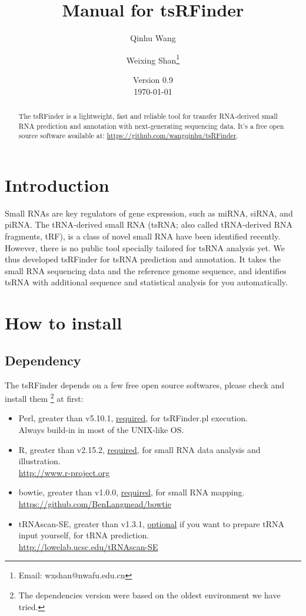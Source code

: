 \documentclass[11pt, a4paper]{article}
\title{Manual for tsRFinder}
\author{Qinhu Wang}
\author{Weixing Shan\thanks{Email: wxshan@nwafu.edu.cn}}
\affil{Northwest A\&F University}
\date{Version 0.9\\[3pt] \today}
\begin{document}
\maketitle

\begin{abstract}
The tsRFinder is a lightweight, fast and reliable tool for transfer RNA-derived small RNA prediction and annotation with next-generating sequencing data. It's a free open source software available at: \url{https://github.com/wangqinhu/tsRFinder}.
\end{abstract}

\clearpage

\tableofcontents

\clearpage

\section{Introduction}

Small RNAs are key regulators of gene expression, such as miRNA, siRNA, and piRNA. The tRNA-derived small RNA (tsRNA; also called tRNA-derived RNA fragments, tRF), is a class of novel small RNA have been identified recently. However, there is no public tool specially tailored for tsRNA analysis yet. We thus developed tsRFinder for tsRNA prediction and annotation. It takes the small RNA sequencing data and the reference genome sequence, and identifies tsRNA with additional sequence and statistical analysis for you automatically.

\section{How to install}

\subsection{Dependency}

The tsRFinder depends on a few free open source softwares, please check and install them \footnote{The dependencies version were based on the oldest environment we have tried.} at first:

\begin{itemize}

\item Perl, greater than v5.10.1, \underline{required}, for tsRFinder.pl execution.\\ Always build-in in most of the UNIX-like OS.
\item R, greater than v2.15.2, \underline{required}, for small RNA data analysis and illustration. \\\url{http://www.r-project.org}
\item bowtie, greater than v1.0.0, \underline{required}, for small RNA mapping. \\\url{https://github.com/BenLangmead/bowtie}
\item tRNAscan-SE, greater than v1.3.1, \underline{optional} if you want to prepare tRNA input yourself, for tRNA prediction. \\\url{http://lowelab.ucsc.edu/tRNAscan-SE}

\end{itemize}
\end{document}

